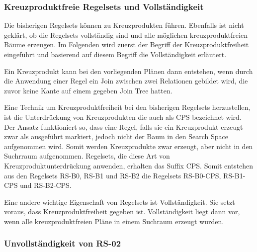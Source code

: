 \subsubsection{Kreuzproduktfreie Regelsets und Vollständigkeit}

Die bisherigen Regelsets können zu Kreuzprodukten führen. Ebenfalls ist nicht geklärt, ob die Regelsets vollständig sind und alle möglichen kreuzproduktfreien Bäume erzeugen. Im Folgenden wird zuerst der Begriff der Kreuzproduktfreiheit eingeführt und basierend auf diesem Begriff die Vollständigkeit erläutert.

Ein Kreuzprodukt kann bei den vorliegenden Plänen dann entstehen, wenn durch die Anwendung einer Regel ein Join zwischen zwei Relationen gebildet wird, die zuvor keine Kante auf einem gegeben Join Tree hatten.

Eine Technik um Kreuzproduktfreiheit bei den bisherigen Regelsets herzustellen, ist die Unterdrückung von Kreuzprodukten die auch als \ac{CPS} bezeichnet wird. Der Ansatz funktioniert so, dass eine Regel, falls sie ein Kreuzprodukt erzeugt zwar als ausgeführt markiert, jedoch nicht der Baum in den Search Space aufgenommen wird. Somit werden Kreuzprodukte zwar erzeugt, aber nicht in den Suchrraum aufgenommen. Regelsets, die diese Art von Kreuzproduktunterdrückung anwenden, erhalten das Suffix CPS. Somit entstehen aus den Regelsets RS-B0, RS-B1 und RS-B2 die Regelsets RS-B0-CPS, RS-B1-CPS und RS-B2-CPS.


Eine andere wichtige Eigenschaft von Regelsets ist Vollständigkeit. Sie setzt voraus, dass Kreuzproduktfreiheit gegeben ist. Vollständigkeit liegt dann vor, wenn alle kreuzproduktfreien Pläne in einem Suchraum erzeugt wurden.


\subsubsection{Unvollständigkeit von RS-02}


